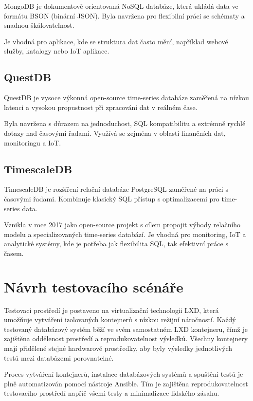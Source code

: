 MongoDB je dokumentově orientovaná NoSQL databáze, která ukládá data ve formátu BSON (binární JSON). 
Byla navržena pro flexibilní práci se schématy a snadnou škálovatelnost.

Je vhodná pro aplikace, kde se struktura dat často mění, například webové služby, katalogy nebo IoT aplikace. \cite{mongodbdocs}

\subsection{QuestDB}

QuestDB je vysoce výkonná open-source time-series databáze zaměřená na nízkou latenci a vysokou propustnost při zpracování dat v reálném čase.

Byla navržena s důrazem na jednoduchost, SQL kompatibilitu a extrémně rychlé dotazy nad časovými řadami. 
Využívá se zejména v oblasti finančních dat, monitoringu a IoT. \cite{questdbdocs}

\subsection{TimescaleDB}

TimescaleDB je rozšíření relační databáze PostgreSQL zaměřené na práci s časovými řadami. Kombinuje klasický SQL přístup s optimalizacemi pro time-series data.

Vznikla v roce 2017 jako open-source projekt s cílem propojit výhody relačního modelu a specializovaných time-series databází. 
Je vhodná pro monitoring, IoT a analytické systémy, kde je potřeba jak flexibilita SQL, tak efektivní práce s časem. \cite{timescaledbdocs}
 

\section{Návrh testovacího scénáře}

Testovací prostředí je postaveno na virtualizační technologii LXD, která umožňuje vytváření izolovaných kontejnerů s 
nízkou režijní náročností. Každý testovaný databázový systém běží ve svém samostatném LXD kontejneru, čímž je 
zajištěna oddělenost prostředí a reprodukovatelnost výsledků. Všechny kontejnery mají přidělené stejné hardwarové prostředky, aby 
byly výsledky jednotlivých testů mezi databázemi porovnatelné.

Proces vytváření kontejnerů, instalace databázových systémů a spuštění testů je plně automatizován pomocí 
nástroje Ansible. Tím je zajištěna reprodukovatelnost testovacího prostředí napříč všemi testy a minimalizace lidského zásahu.

